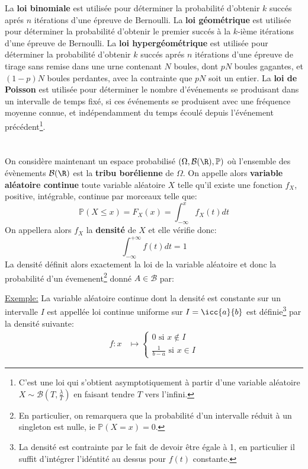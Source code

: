 La \textbf{loi binomiale} est utilisée pour déterminer la probabilité d'obtenir \(k\) succés aprés \(n\) itérations d'une épreuve de Bernoulli. \+
La \textbf{loi géométrique} est utilisée pour déterminer la probabilité d'obtenir le premier succés à la \(k\)-ième itérations d'une épreuve de Bernoulli.\+
La \textbf{loi hypergéométrique} est utilisée pour déterminer la probabilité d'obtenir \(k\) succés aprés \(n\) itérations d'une épreuve de tirage sans remise dans une urne contenant \(N\) boules, dont \(pN\) boules gagantes, et \((1-p)N\) boules perdantes, avec la contrainte que \(pN\) soit un entier.\+
La \textbf{loi de Poisson} est utilisée pour déterminer le nombre d'événements se produisant dans un intervalle de temps fixé, si ces événements se produisent avec une fréquence moyenne connue, et indépendamment du temps écoulé depuis l'événement précédent\footnote[2]{C'est une loi qui s'obtient asymptotiquement à partir d'une variable aléatoire \(X \sim \mathcal{B}(T, \frac{\lambda}{T})\) en faisant tendre \(T\) vers l'infini.}.\+
\chapter*{} %
On considère maintenant un espace probabilisé \((\Omega, \mathcal{B}(\R), \mathbb{P})\) où l'ensemble des évènements \(\mathcal{B}(\R)\) est la \textbf{tribu borélienne} de \(\Omega\).\+
On appelle alors \textbf{variable aléatoire continue} toute variable aléatoire \(X\) telle qu'il existe une fonction \(f_X\), positive, intégrable, continue par morceaux telle que:
\[
   \mathbb{P}(X \leq x) = F_X(x) = \int_{-\infty}^{x} f_X(t) d t   
\]
On appellera alors \(f_X\) la \textbf{densité} de \(X\) et elle vérifie donc:
\[
   \int_{-\infty}^{+\infty} f(t) d t = 1
\]
La densité définit alors exactement la  loi de la variable aléatoire et donc la probabilité d'un évemenent\footnote[1]{En particulier, on remarquera que la probabilité d'un intervalle réduit à un singleton est nulle, ie \(\mathbb{P}(X = x) = 0\).} donné \(A \in \mathscr{B}\) par:

\underline{Exemple:} La variable aléatoire continue dont la densité est constante sur
un intervalle \(I\)  est appellée loi continue uniforme sur \(I = \icc{a}{b}\) est définie\footnote[2]{La densité est contrainte par le fait de devoir être égale à 1, en particulier il suffit d'intégrer l'idéntité au dessus pour \(f(t)\) constante.} par la densité suivante:
\[
   \begin{aligned}
      f: x &\longmapsto \begin{cases}
         0 \text{ si } x  \notin I\\
         \frac{1}{b - a} \text{ si } x \in I
      \end{cases}
   \end{aligned}
\]

